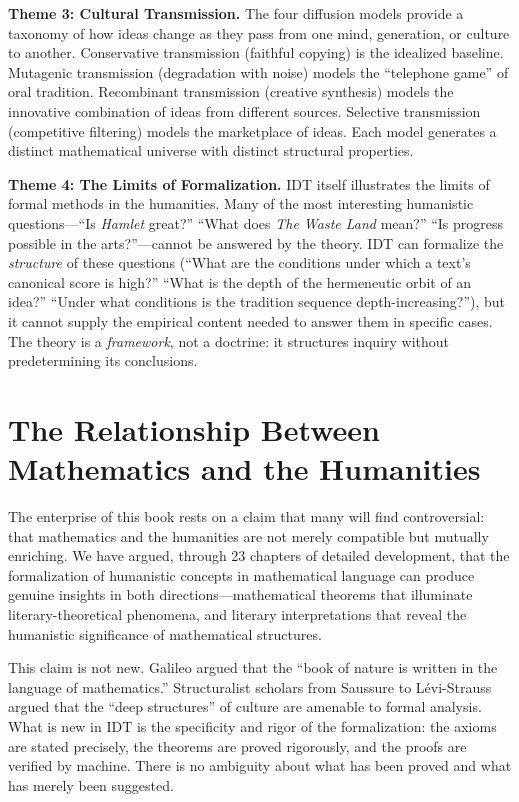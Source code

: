 \documentclass[11pt,openany]{book}
\theoremstyle{definition}
\theoremstyle{plain}
\theoremstyle{remark}
\begin{document}
\textbf{Theme 3: Cultural Transmission.} The four diffusion models provide a taxonomy of how ideas change as they pass from one mind, generation, or culture to another. Conservative transmission (faithful copying) is the idealized baseline. Mutagenic transmission (degradation with noise) models the ``telephone game'' of oral tradition. Recombinant transmission (creative synthesis) models the innovative combination of ideas from different sources. Selective transmission (competitive filtering) models the marketplace of ideas. Each model generates a distinct mathematical universe with distinct structural properties.

\textbf{Theme 4: The Limits of Formalization.} IDT itself illustrates the limits of formal methods in the humanities. Many of the most interesting humanistic questions---``Is \emph{Hamlet} great?'' ``What does \emph{The Waste Land} mean?'' ``Is progress possible in the arts?''---cannot be answered by the theory. IDT can formalize the \emph{structure} of these questions (``What are the conditions under which a text's canonical score is high?'' ``What is the depth of the hermeneutic orbit of an idea?'' ``Under what conditions is the tradition sequence depth-increasing?''), but it cannot supply the empirical content needed to answer them in specific cases. The theory is a \emph{framework}, not a doctrine: it structures inquiry without predetermining its conclusions.

\section*{The Relationship Between Mathematics and the Humanities}

The enterprise of this book rests on a claim that many will find controversial: that mathematics and the humanities are not merely compatible but mutually enriching. We have argued, through 23 chapters of detailed development, that the formalization of humanistic concepts in mathematical language can produce genuine insights in both directions---mathematical theorems that illuminate literary-theoretical phenomena, and literary interpretations that reveal the humanistic significance of mathematical structures.

This claim is not new. Galileo argued that the ``book of nature is written in the language of mathematics.'' Structuralist scholars from Saussure to L\'evi-Strauss argued that the ``deep structures'' of culture are amenable to formal analysis. What is new in IDT is the specificity and rigor of the formalization: the axioms are stated precisely, the theorems are proved rigorously, and the proofs are verified by machine. There is no ambiguity about what has been proved and what has merely been suggested.
\end{document}
